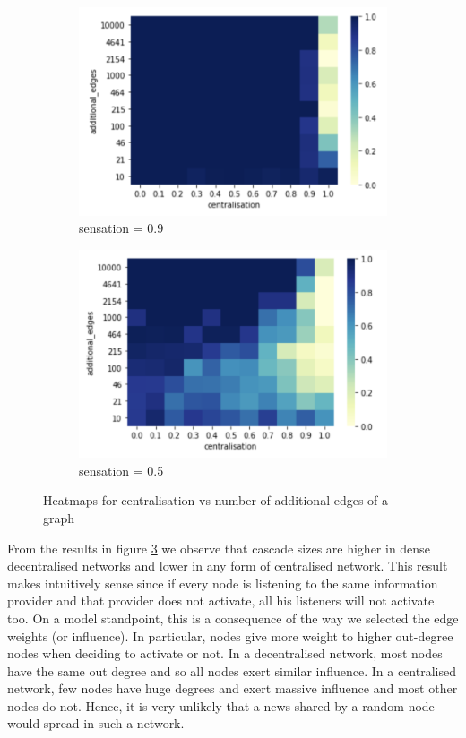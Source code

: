 \documentclass[10pt]{article}
\begin{document}
\begin{figure}[h]
\centering
\begin{subfigure}{.5\textwidth}
  \centering
  \includegraphics[width=.9\linewidth]{heatmap_graph_structure_09}
  \caption{sensation = 0.9}
  \label{fig:graph structure:sub1}
\end{subfigure}%
\begin{subfigure}{.5\textwidth}
  \centering
  \includegraphics[width=.9\linewidth]{heatmap_graph_structure_050}
  \caption{sensation = 0.5}
  \label{fig:graph structure:sub2}
\end{subfigure}
\caption{Heatmaps for centralisation vs number of additional edges of a graph}
\label{fig:graph structure}
\end{figure}

From the results in figure \ref{fig:graph structure} we observe that cascade sizes are higher in dense decentralised networks and lower in any form of centralised network. This result makes intuitively sense since if every node is listening to the same information provider and that provider does not activate, all his listeners will not activate too. On a model standpoint, this is a consequence of the way we selected the edge weights (or influence). In particular, nodes give more weight to higher out-degree nodes when deciding to activate or not. In a decentralised network, most nodes have the same out degree and so all nodes exert similar influence. In a centralised network, few nodes have huge degrees and exert massive influence and most other nodes do not. Hence, it is very unlikely that a news shared by a random node would spread in such a network. \\
\end{document}
